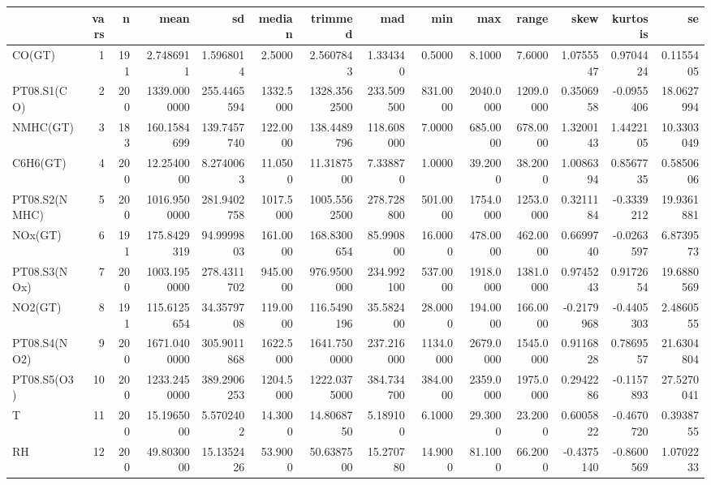 
\begin{tabular}{l|r|r|r|r|r|r|r|r|r|r|r|r|r}
\hline
  & vars & n & mean & sd & median & trimmed & mad & min & max & range & skew & kurtosis & se\\
\hline
CO(GT) & 1 & 191 & 2.7486911 & 1.5968014 & 2.5000 & 2.5607843 & 1.334340 & 0.5000 & 8.1000 & 7.6000 & 1.0755547 & 0.9704424 & 0.1155405\\
\hline
PT08.S1(CO) & 2 & 200 & 1339.0000000 & 255.4465594 & 1332.5000 & 1328.3562500 & 233.509500 & 831.0000 & 2040.0000 & 1209.0000 & 0.3506958 & -0.0955406 & 18.0627994\\
\hline
NMHC(GT) & 3 & 183 & 160.1584699 & 139.7457740 & 122.0000 & 138.4489796 & 118.608000 & 7.0000 & 685.0000 & 678.0000 & 1.3200143 & 1.4422105 & 10.3303049\\
\hline
C6H6(GT) & 4 & 200 & 12.2540000 & 8.2740063 & 11.0500 & 11.3187500 & 7.338870 & 1.0000 & 39.2000 & 38.2000 & 1.0086394 & 0.8567735 & 0.5850606\\
\hline
PT08.S2(NMHC) & 5 & 200 & 1016.9500000 & 281.9402758 & 1017.5000 & 1005.5562500 & 278.728800 & 501.0000 & 1754.0000 & 1253.0000 & 0.3211184 & -0.3339212 & 19.9361881\\
\hline
NOx(GT) & 6 & 191 & 175.8429319 & 94.9999803 & 161.0000 & 168.8300654 & 85.990800 & 16.0000 & 478.0000 & 462.0000 & 0.6699740 & -0.0263597 & 6.8739573\\
\hline
PT08.S3(NOx) & 7 & 200 & 1003.1950000 & 278.4311702 & 945.0000 & 976.9500000 & 234.992100 & 537.0000 & 1918.0000 & 1381.0000 & 0.9745243 & 0.9172654 & 19.6880569\\
\hline
NO2(GT) & 8 & 191 & 115.6125654 & 34.3579708 & 119.0000 & 116.5490196 & 35.582400 & 28.0000 & 194.0000 & 166.0000 & -0.2179968 & -0.4405303 & 2.4860555\\
\hline
PT08.S4(NO2) & 9 & 200 & 1671.0400000 & 305.9011868 & 1622.5000 & 1641.7500000 & 237.216000 & 1134.0000 & 2679.0000 & 1545.0000 & 0.9116828 & 0.7869557 & 21.6304804\\
\hline
PT08.S5(O3) & 10 & 200 & 1233.2450000 & 389.2906253 & 1204.5000 & 1222.0375000 & 384.734700 & 384.0000 & 2359.0000 & 1975.0000 & 0.2942286 & -0.1157893 & 27.5270041\\
\hline
T & 11 & 200 & 15.1965000 & 5.5702402 & 14.3000 & 14.8068750 & 5.189100 & 6.1000 & 29.3000 & 23.2000 & 0.6005822 & -0.4670720 & 0.3938755\\
\hline
RH & 12 & 200 & 49.8030000 & 15.1352426 & 53.9000 & 50.6387500 & 15.270780 & 14.9000 & 81.1000 & 66.2000 & -0.4375140 & -0.8600569 & 1.0702233\\

\end{tabular}
